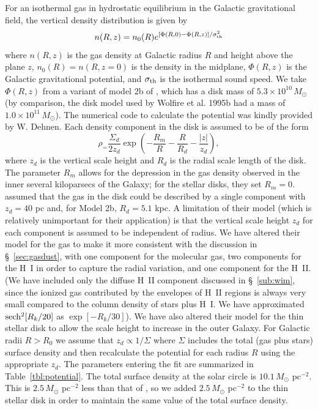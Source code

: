 \documentclass[12pt,preprint,flushrt]{aastex}
\newcommand{\beq}{\begin{equation}}
\newcommand{\eeq}{\end{equation}}
\begin{document}
For an isothermal
gas in hydrostatic equilibrium in the Galactic gravitational field,
the vertical density distribution is given by
\begin{equation}
n(R,z) = n_0(R)e^{[\Phi (R,0)-\Phi (R,z)]/\sigma_{\rm th}^2}
\label{eq:nrz}
\end{equation}
where $n(R,z)$ is the gas density at Galactic radius $R$ and height
above the plane $z$, $n_0(R) = n(R, z = 0)$ is the density in the
midplane,
 $\Phi (R,z)$ is the Galactic gravitational
potential, and $\sigma_{\rm th}$ is the isothermal
sound speed. We take $\Phi (R,z)$ from
a variant of model 2b of \cite{deh98},
which has a disk mass of $5.3\times 10^{10}\, M_\odot$ (by comparison,
the disk model used by Wolfire et al. 1995b had a mass of $1.0
\times 10^{11}\, M_\odot$).  The numerical code to calculate the
potential was kindly provided by W. Dehnen.
Each density component in the disk is assumed to be of the form
\beq
\rho_=\frac{\Sigma_{d}}{2z_{d}}\exp\left(-\frac{R_m}{R}
        -\frac{R}{R_d}-\frac{|z|}{z_{d}}\right),
\eeq
where $z_d$ is the vertical scale height and $R_d$ is the
radial scale length of the disk.  The parameter $R_m$ allows for
the depression in the gas density observed in the inner several
kiloparsecs of the Galaxy; for the stellar disks, they set $R_m=0$.
\cite{deh98} assumed that the gas in the disk could be described by
a single component with $z_d=40$ pc and, for Model 2b, $R_d=5.1$ kpc.
A limitation of their model (which is relatively unimportant
for their application) is that the vertical scale height $z_d$ for
each component is assumed to be independent of radius.
We have altered their model for the gas to make it more
consistent with the discussion in \S~\ref{sec:gasdust}, with one component
for the molecular gas, two components for the H~I in order
to capture the radial variation, and one component for the H~II.
(We have included only the diffuse H~II component
discussed in \S~\ref{sub:wim}, since
the ionized gas contributed by the envelopes of H~II regions
is always very small compared to the column density of stars plus
H~I.  We have approximated ${\rm sech^2}[R_k/20]$ as $\exp[-R_k/30]$).
We have also altered their model for the thin stellar disk to allow the
scale height to increase in the outer Galaxy. For Galactic radii $R > R_0$
we assume that $z_d \propto 1/\Sigma$ where $\Sigma$ includes the
total (gas plus stars) surface density and then recalculate the potential
for each radius $R$ using the appropriate $z_d$.
The parameters entering the fit are summarized in Table~\ref{tbl:potential}.
The total surface density at the solar circle is $10.1\, M_\odot$ pc$^{-2}$.
This is $2.5\, M_\odot$ pc$^{-2}$ less than that of \cite{deh98}, so we
added $2.5\, M_\odot$ pc$^{-2}$ to the thin stellar disk in order to maintain
the same value of the total surface density.
\end{document}

